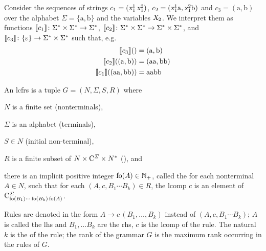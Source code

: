 \documentclass[../document.tex]{subfiles}
\begin{document}
    \begin{example}
        Consider the sequences of strings \(c_1 = (\textsl{x}_1^1\,\textsl{x}_1^2)\), \(c_2 = (\textsl{x}_1^1 \text{a}, \textsl{x}_1^2 \text{b})\) and \(c_3 = (\text{a}, \text{b})\) over the alphabet \(\Sigma=\{\text{a}, \text{b}\}\) and the variables \(\textsl{X}_{2}\).
        We interpret them as functions \(\llbracket c_1\rrbracket\colon \Sigma^* \times \Sigma^* \to \Sigma^*\), \(\llbracket c_2\rrbracket\colon \Sigma^* \times \Sigma^* \to \Sigma^* \times \Sigma^*\), and \(\llbracket c_3\rrbracket\colon \{\varepsilon\} \to \Sigma^* \times \Sigma^*\) such that, e.g.
        \begin{align*}
            \llbracket c_3\rrbracket() &= (\text{a}, \text{b}) \\
            \llbracket c_2\rrbracket((\text{a}, \text{b})) &= (\text{aa}, \text{bb}) \\
            \llbracket c_1\rrbracket((\text{aa}, \text{bb})) &= \text{aabb}
        \end{align*}
    \end{example}

    \begin{definition}
        An \gls{lcfrs} is a tuple \(G=(N, \varSigma, S, R)\) where
        \begin{compactenum}[(i)]
            \item \(N\) is a finite set (\glspl{nonterminal}),
            \item \(\varSigma\) is an alphabet (\glspl{terminal}),
            \item \(S \in N\) (initial non-terminal),
            \item \(R\) is a finite subset of \(N \times \mathrm{C}^\varSigma \times N^*\) (), and
            \item there is an implicit positive integer \(\operatorname{fo}(A) \in \mathbb{N}_+\), called the  for each nonterminal \(A \in N\), such that
            for each \((A, c, B_1\cdots B_k) \in R\), the \gls{lcomp} \(c\) is an element of \(\mathrm{C}^\varSigma_{\operatorname{fo}(B_1) \cdots \operatorname{fo}(B_k) \operatorname{fo}(A)}\).
        \end{compactenum}

        Rules are denoted in the form \(A \to c\,(B_1, \ldots, B_k)\) instead of \((A, c, B_1 \cdots B_k)\); \(A\) is called the \gls{lhs} and \(B_1, \ldots B_k\) are the \gls{rhs}, \(c\) is the \gls*{lcomp} of the \gls*{rule}.
        The natural \(k\) is the  of the rule; the \gls*{rank} of the grammar \(G\) is the maximum rank occurring in the rules of \(G\).
    \end{definition}
\end{document}
